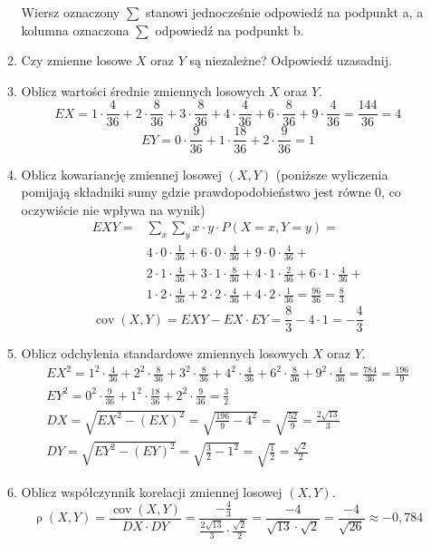\documentclass[twoside]{mwart}
\newcommand{\ans}[1]{}
\newenvironment{ansenv}{\comment}{\endcomment}
\newenvironment{ansenv}{\paragraph{Odpowiedź:}}{}
\newcommand{\ans}[1]{\begin{ansenv}#1\end{ansenv}}
\DeclareMathOperator{\cov}{cov}
\DeclareMathOperator{\corr}{\rho}
\begin{document}
\begin{enumerate}
\begin{enumerate}
\begin{ansenv}
		Wiersz oznaczony $\sum$ stanowi jednocześnie odpowiedź na podpunkt a, a kolumna oznaczona $\sum$ odpowiedź na podpunkt b.
	\end{ansenv}
	\item Czy zmienne losowe $X$ oraz $Y$ są niezależne? Odpowiedź uzasadnij.
	\ans{Zmienne są niezależne, bo np. $P(X=1,Y=0)=0\neq P(X=1)\cdot P(Y=0)=\frac{9}{36}\cdot\frac{4}{36}=\frac{1}{36}$}
	\item Oblicz wartości średnie zmiennych losowych $X$ oraz $Y$.
	\begin{ansenv}
		\[
		EX = 1\cdot \frac{4}{36} + 2\cdot\frac{8}{36} + 3\cdot\frac{8}{36} + 4\cdot\frac{4}{36} + 6\cdot\frac{8}{36} + 9\cdot\frac{4}{36} = \frac{144}{36} = 4
		\]
		\[
		EY = 0\cdot \frac{9}{36} + 1\cdot\frac{18}{36} + 2\cdot\frac{9}{36} = 1
		\]
	\end{ansenv}
	\item Oblicz kowariancję zmiennej losowej $(X,Y)$ (poniższe wyliczenia pomijają składniki sumy gdzie prawdopodobieństwo jest równe 0, co oczywiście nie wpływa na wynik)
	\begin{ansenv}
		\begin{align*}
		EXY = & \sum_x\sum_y x\cdot y\cdot P(X=x, Y=y) = \\ & 4\cdot 0\cdot \frac{1}{36} + 6\cdot 0\cdot \frac{4}{36} + 9\cdot 0\cdot \frac{4}{36} + \\ & 2\cdot 1\cdot \frac{4}{36} + 3\cdot 1\cdot \frac{8}{36} + 4\cdot 1\cdot \frac{2}{36} + 6\cdot 1\cdot \frac{4}{36} + \\ & 1\cdot 2\cdot \frac{4}{36} + 2\cdot 2\cdot \frac{4}{36} + 4\cdot 2\cdot \frac{1}{36} = \frac{96}{36} = \frac{8}{3}
		\end{align*}
		\[ \cov(X,Y)=EXY-EX\cdot EY = \frac{8}{3} - 4\cdot 1 = -\frac{4}{3} \]
	\end{ansenv}
	\item Oblicz odchylenia standardowe zmiennych losowych $X$ oraz $Y$.
	\begin{ansenv}
		\begin{gather*}
		EX^2 = 1^2\cdot \frac{4}{36} + 2^2\cdot\frac{8}{36} + 3^2\cdot\frac{8}{36} + 4^2\cdot\frac{4}{36} + 6^2\cdot\frac{8}{36} + 9^2\cdot\frac{4}{36} = \frac{784}{36} = \frac{196}{9} \\
		EY^2 = 0^2\cdot \frac{9}{36} + 1^2\cdot\frac{18}{36} + 2^2\cdot\frac{9}{36} = \frac{3}{2} \\
		DX = \sqrt{EX^2 - (EX)^2} = \sqrt{\frac{196}{9} - 4^2} = \sqrt{\frac{52}{9}} = \frac{2\sqrt{13}}{3} \\
		DY = \sqrt{EY^2- (EY)^2} = \sqrt{\frac{3}{2}-1^2} = \sqrt{\frac{1}{2}} = \frac{\sqrt{2}}{2}
		\end{gather*}
	\end{ansenv}
	\item Oblicz współczynnik korelacji zmiennej losowej $(X,Y)$.
	\begin{ansenv}
		\[\corr(X,Y)=\frac{\cov(X,Y)}{DX\cdot DY} = \frac{-\frac{4}{3}}{\frac{2\sqrt{13}}{3}\cdot \frac{\sqrt{2}}{2}} =
		\frac{-4}{\sqrt{13}\cdot\sqrt{2}} = \frac{-4}{\sqrt{26}} \approx -0{,}784 \]
	\end{ansenv}
\end{enumerate}


\end{enumerate}
\end{document}
